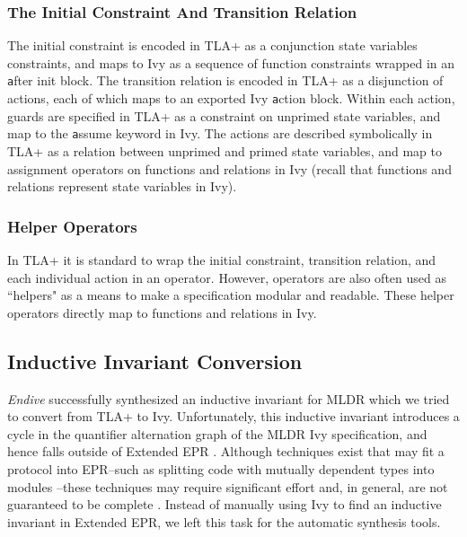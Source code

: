 \documentclass[runningheads]{llncs}
\newcommand{\ivy}[1]{{\small\texttt #1}}
\begin{document}
\subsubsection{The Initial Constraint And Transition Relation}

The initial constraint is encoded in TLA+ as a conjunction state variables constraints, and maps to Ivy as a sequence of function constraints wrapped in an \ivy{after init} block.  The transition relation is encoded in TLA+ as a disjunction of actions, each of which maps to an exported Ivy \ivy{action} block.  Within each action, guards are specified in TLA+ as a constraint on unprimed state variables, and map to the \ivy{assume} keyword in Ivy.  The actions are described symbolically in TLA+ as a relation between unprimed and primed state variables, and map to assignment operators on functions and relations in Ivy (recall that functions and relations represent state variables in Ivy).

\subsubsection{Helper Operators}

In TLA+ it is standard to wrap the initial constraint, transition relation, and each individual action in an operator.  However, operators are also often used as ``helpers" as a means to make a specification modular and readable.  These helper operators directly map to functions and relations in Ivy.

\subsection{Inductive Invariant Conversion}
\label{subsec:indinv-conv}

\textit{Endive} successfully synthesized an inductive invariant for MLDR which we tried to convert from TLA+ to Ivy.  Unfortunately, this inductive invariant introduces a cycle in the quantifier alternation graph of the MLDR Ivy specification, and hence falls outside of Extended EPR \cite{padonpaxosEPR}.  Although techniques exist that may fit a protocol into EPR--such as splitting code with mutually dependent types into modules \cite{McMillan2018DeductiveVI}--these techniques may require significant effort and, in general, are not guaranteed to be complete \cite{padonpaxosEPR}.  Instead of manually using Ivy to find an inductive invariant in Extended EPR, we left this task for the automatic synthesis tools.
\end{document}
